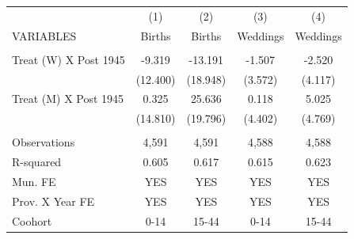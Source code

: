 \begin{tabular}{lcccc} \hline
 & (1) & (2) & (3) & (4) \\
VARIABLES & Births & Births & Weddings & Weddings \\ \hline
 &  &  &  &  \\
Treat (W) X Post 1945 & -9.319 & -13.191 & -1.507 & -2.520 \\
 & (12.400) & (18.948) & (3.572) & (4.117) \\
Treat (M) X Post 1945 & 0.325 & 25.636 & 0.118 & 5.025 \\
 & (14.810) & (19.796) & (4.402) & (4.769) \\
 &  &  &  &  \\
Observations & 4,591 & 4,591 & 4,588 & 4,588 \\
R-squared & 0.605 & 0.617 & 0.615 & 0.623 \\
Mun. FE & YES & YES & YES & YES \\
Prov. X Year FE & YES & YES & YES & YES \\
 Coohort & 0-14 & 15-44 & 0-14 & 15-44 \\ \hline
\end{tabular}
